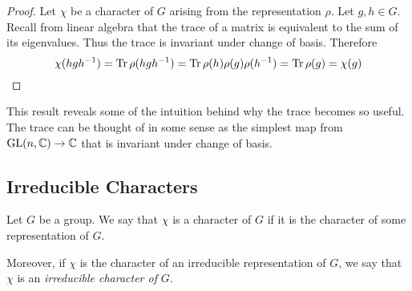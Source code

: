 \begin{proof}
    Let $\chi$ be a character of $G$ arising from the representation $\rho$. Let $g, h \in G$. Recall from linear 
    algebra that the trace of a matrix is equivalent to the sum of its eigenvalues.  Thus the trace is invariant 
    under change of basis. Therefore
    \[
        \chi(hgh^{-1}) = \text{Tr}\, \rho(hgh^{-1}) = \text{Tr}\, \rho(h) \rho(g)\rho(h^{-1}) = \text{Tr}\, \rho(g) = \chi(g)
    \]
\end{proof}

This result reveals some of the intuition behind why the trace becomes so useful. The trace can be thought of in 
some sense as the simplest map from $\operatorname{GL}(n, \mathbb{C}) \rightarrow \mathbb{C}$ that is invariant under change of basis. 









\subsection{Irreducible Characters}

\begin{definition}
    Let $G$ be a group. We say that $\chi$ is a character of $G$ if it is the character of some representation of 
    $G$.

    Moreover, if $\chi$ is the character of an irreducible representation of $G$, we say that $\chi$ is an
    \emph{irreducible character of} $G$.
\end{definition}

